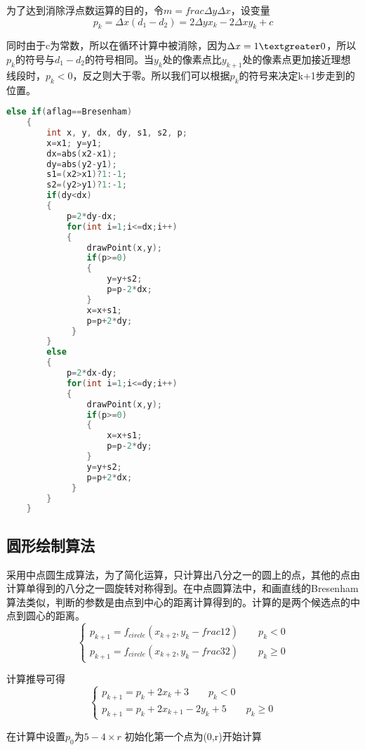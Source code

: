 \documentclass[a4paper,UTF8]{article}
\theoremstyle{definition}
\begin{document}
\par 为了达到消除浮点数运算的目的，令$m=frac{\Delta y}{\Delta x}$，设变量
\begin{equation}
p_{k}=\Delta x (d_{1}-d_{2})=2\Delta y x_{k}-2\Delta x y_{k}+c
\end{equation}
\par 同时由于c为常数，所以在循环计算中被消除，因为$\Delta x=1 \textgreater 0$，所以$p_{k}$的符号与$d_{1}-d_{2}$的符号相同。当$y_{k}$处的像素点比$y_{k+1}$处的像素点更加接近理想线段时，$p_{k}<0$，反之则大于零。所以我们可以根据$p_{k}$的符号来决定k+1步走到的位置。
\par 
\begin{lstlisting}[language={C++}]
 else if(aflag==Bresenham)
    {
        int x, y, dx, dy, s1, s2, p;
        x=x1; y=y1;
        dx=abs(x2-x1);
        dy=abs(y2-y1);
        s1=(x2>x1)?1:-1;
        s2=(y2>y1)?1:-1;
        if(dy<dx)
        {
            p=2*dy-dx;
            for(int i=1;i<=dx;i++)
            {
                drawPoint(x,y);
                if(p>=0)
                {
                    y=y+s2;
                    p=p-2*dx;
                }
                x=x+s1;
                p=p+2*dy;
             }
        }
        else
        {
            p=2*dx-dy;
            for(int i=1;i<=dy;i++)
            {
                drawPoint(x,y);
                if(p>=0)
                {
                    x=x+s1;
                    p=p-2*dy;
                }
                y=y+s2;
                p=p+2*dx;
             }
        }
    }
\end{lstlisting}

\subsection{圆形绘制算法}
采用中点圆生成算法，为了简化运算，只计算出八分之一的圆上的点，其他的点由计算单得到的八分之一圆旋转对称得到。在中点圆算法中，和画直线的Bresenham算法类似，判断的参数是由点到中心的距离计算得到的。计算的是两个候选点的中点到圆心的距离。
\begin{equation}
\left\{
\begin{aligned}
p_{k+1}=f_{circle}(x_{k+2},y_{k}-frac{1}{2}) \qquad p_{k}<0\\
p_{k+1}=f_{circle}(x_{k+2},y_{k}-frac{3}{2}) \qquad p_{k}\geq 0
\end{aligned}
\right.
\end{equation}
\par 计算推导可得
\begin{equation}
\left\{
\begin{aligned}
p_{k+1}=p_{k}+2x_{k}+3 \qquad p_{k}<0\\
p_{k+1}=p_{k}+2x_{k+1}-2y_{k}+5 \qquad p_{k}\geq 0
\end{aligned}
\right.
\end{equation}
\par 在计算中设置$p_{0}$为$5-4\times r$ 初始化第一个点为(0,r)开始计算
\end{document}
